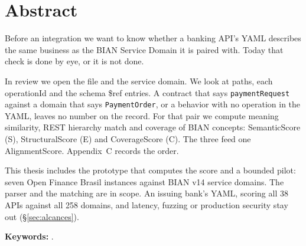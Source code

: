 \chapter*{Abstract}


Before an integration we want to know whether a banking API's YAML describes the same business as
the BIAN Service Domain it is paired with. Today that check is done by eye, or it is not done.

In review we open the file and the service domain. We look at paths, each operationId and the
schema \$ref entries. A contract that says \texttt{paymentRequest} against a domain that says
\texttt{PaymentOrder}, or a behavior with no operation in the YAML, leaves no number on the record.
For that pair we compute meaning similarity, REST hierarchy match and coverage of BIAN concepts:
SemanticScore (S), StructuralScore (E) and CoverageScore (C). The three feed one AlignmentScore.
Appendix~C records the order.

This thesis includes the prototype that computes the score and a bounded pilot: seven Open
Finance Brasil instances against BIAN v14 service domains. The parser and the matching are in
scope. An issuing bank's YAML, scoring all 38 APIs against all 258 domains, and latency, fuzzing
or production security stay out (§\ref{sec:alcances}).

\vspace{0.5cm}
\noindent\textbf{Keywords:} \palabrasClaveEN.

